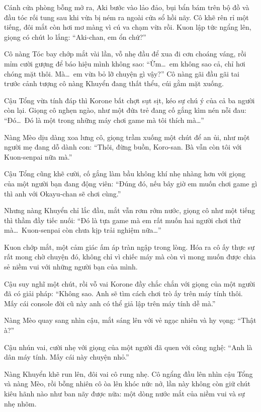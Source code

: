 \documentclass[../main.tex]{subfiles}
\begin{document}
Cánh cửa phòng bỗng mở ra, Aki bước vào lảo đảo, bụi bẩn bám trên bộ đồ và đầu tóc rối tung sau khi vừa bị ném ra ngoài cửa sổ hồi nãy. Cô khẽ rên rỉ một tiếng, đôi mắt còn hơi mơ màng vì cú va chạm vừa rồi. Kuon lập tức ngẩng lên, giọng có chút lo lắng: ``Aki-chan, em ổn chứ?''

Cô nàng Tóc bay chớp mắt vài lần, vỗ nhẹ đầu để xua đi cơn choáng váng, rồi mỉm cười gượng để báo hiệu mình không sao: ``Ừm\dots\ em không sao cả, chỉ hơi chóng mặt thôi. Mà\dots\ em vừa bỏ lỡ chuyện gì vậy?'' Cô nàng gãi đầu gãi tai trước cảnh tượng cô nàng Khuyển đang thất thểu, cúi gằm mặt xuống.

Cậu Tổng vừa tính đáp thì Korone bất chợt sụt sịt, kéo sự chú ý của cả ba người còn lại. Giọng cô nghẹn ngào, như một đứa trẻ đang cố gắng kìm nén nỗi đau: ``Đó\dots\ Đó là một trong những máy chơi game mà tôi thích mà\dots''

Nàng Mèo dịu dàng xoa lưng cô, giọng trầm xuống một chút để an ủi, như một người mẹ đang dỗ dành con: ``Thôi, đừng buồn, Koro-san. Bà vẫn còn tôi với Kuon-senpai nữa mà.''

Cậu Tổng cũng khẽ cười, cố gắng làm bầu không khí nhẹ nhàng hơn với giọng của một người bạn đang động viên: ``Đúng đó, nếu bây giờ em muốn chơi game gì thì anh với Okayu-chan sẽ chơi cùng.''

Nhưng nàng Khuyển chỉ lắc đầu, mắt vẫn rơm rớm nước, giọng cô như một tiếng thì thầm đầy tiếc nuối: ``Đó là tựa game mà em rất muốn hai người chơi thử mà\dots\ Kuon-senpai còn chưa kịp trải nghiệm nữa\dots''

Kuon chớp mắt, một cảm giác ấm áp tràn ngập trong lòng. Hóa ra cô ấy thực sự rất mong chờ chuyện đó, không chỉ vì chiếc máy mà còn vì mong muốn được chia sẻ niềm vui với những người bạn của mình.

Cậu suy nghĩ một chút, rồi vỗ vai Korone đầy chắc chắn với giọng của một người đã có giải pháp: ``Không sao. Anh sẽ tìm cách chơi trò ấy trên máy tính thôi. Mấy cái console đời cũ này anh có thể giả lập trên máy tính dễ mà.''

Nàng Mèo quay sang nhìn cậu, mắt sáng lên với vẻ ngạc nhiên và hy vọng: ``Thật à?''

Cậu nhún vai, cười nhẹ với giọng của một người đã quen với công nghệ: ``Anh là dân máy tính. Mấy cái này chuyện nhỏ.''

Nàng Khuyển khẽ run lên, đôi vai cô rung nhẹ. Cô ngẩng đầu lên nhìn cậu Tổng và nàng Mèo, rồi bỗng nhiên cô òa lên khóc nức nở, lần này không còn giữ chút kiêu hãnh nào như ban nãy được nữa: một dòng nước mắt của niềm vui và sự nhẹ nhõm.
\end{document}
